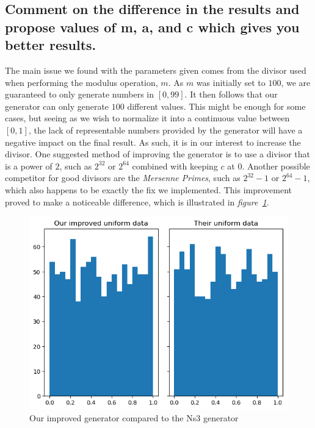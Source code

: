 \documentclass[a4paper, titlepage,12pt]{article}
\begin{document}
		\subsection{Comment on the difference in the results and propose values of m, a, and c which gives you better results.}
		The main issue we found with the parameters given comes from the divisor used when performing the modulus operation, $m$. As $m$ was initially set to $100$, we are guaranteed to only generate numbers in $[0, 99]$. It then follows that our generator can only generate $100$ different values. This might be enough for some cases, but seeing as we wish to normalize it into a continuous value between $[0, 1]$, the lack of representable numbers provided by the generator will have a negative impact on the final result. As such, it is in our interest to increase the divisor. One suggested method of improving the generator is to use a divisor that is a power of $2$, such as $2^{32}$ or $2^{64}$ combined with keeping $c$ at $0$\cite{artofprogramming}. Another possible competitor for good divisors are the \emph{Mersenne Primes}, such as $2^{32}-1$ or $2^{64}-1$\cite{mersenne}, which also happens to be exactly the fix we implemented. This improvement proved to make a noticeable difference, which is illustrated in \textit{figure~\ref{improved_uniform_plots}}.
		\begin{figure}[h!]
			\begin{center}
				\includegraphics[scale=0.8]{./improved_uniform_histogram_plot.png}
				\caption{Our improved generator compared to the Ns3 generator}
				\label{improved_uniform_plots}
			\end{center}
		\end{figure}
\end{document}
